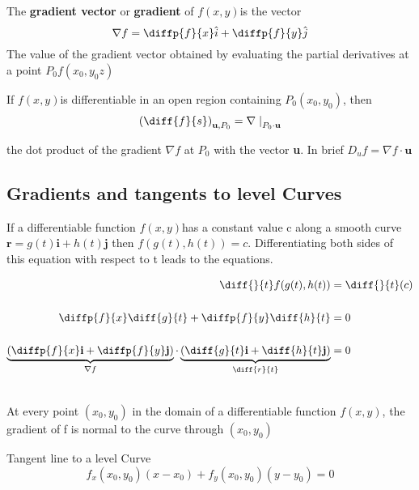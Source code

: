 \documentclass[12pt,a4paper]{article}
\newenvironment{definition}{\begin{definitionbox}}{\end{definitionbox}\vspace{1\baselineskip}}
\newenvironment{ruleBox}[1]{\begin{rulebox}{#1}}{\end{rulebox}\vspace{1\baselineskip}}
\newenvironment{mynote}{\vspace{1\baselineskip}\begin{note}}{\end{note}\vspace{1\baselineskip}}
\newcommand{\fxy}{\(f(x,y)\)}
\begin{document}
\begin{definition}
    The \textbf{gradient vector} or \textbf{gradient} of \fxy is the vector
    \[\nabla f = \diffp{f}{x} \hat{i} + \diffp{f}{y} \hat{j} \]
    The value of the gradient vector obtained by evaluating the partial derivatives at a point \(P_0 f(x_0,y_0z)\)
    
\end{definition}


\begin{definition}
    If \fxy is differentiable in an open region containing \(P_0(x_0,y_0)\), then
    \[\left(\diff{f}{s}\right)_{\mathbf{u},P_0} = \nabla \left. \right|_{P_0 \cdot \mathbf{u}}\]

    the dot product of the gradient \(\nabla f\) at \(P_0\) with the vector \textbf{u}. In brief \(D_u f = \nabla f \cdot \mathbf{u}\)

\end{definition}


\subsection{Gradients and tangents to level Curves}

If a differentiable function \fxy has a constant value c along a smooth curve \(\mathbf{r} = g(t)\mathbf{i} + h(t) \mathbf{j}\) then \(f(g(t),h(t)) = c\). Differentiating both sides of this equation with respect to t leads to the equations.


\begin{align*}
    \diff{}{t}f(g(t),h(t)) &= \diff{}{t}(c) \\[1\baselineskip]
    \diffp{f}{x} \diff{g}{t} + \diffp{f}{y} \diff{h}{t} &= 0 \\[1\baselineskip]
    \underbrace{\left(\diffp{f}{x}\mathbf{i} + \diffp{f}{y}\mathbf{j}\right)}_{\nabla f} \cdot \underbrace{\left(\diff{g}{t}\textbf{i} + \diff{h}{t}\mathbf{j}\right)}_{\diff{r}{t}} &= 0\\[1\baselineskip]
\end{align*}

\begin{mynote}
    At every point \((x_0,y_0)\) in the domain of a differentiable function \fxy, the gradient of f is normal to the curve through \((x_0,y_0)\)
\end{mynote}




\begin{ruleBox}{Tangent line to a level Curve}
    \[f_x(x_0,y_0)(x-x_0) + f_y(x_0,y_0)(y-y_0) = 0\]
\end{ruleBox}
\end{document}
